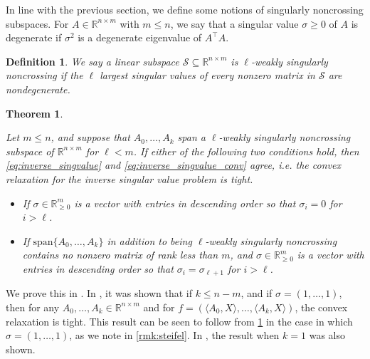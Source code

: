 \documentclass{article}
\numberwithin{equation}{section}
\newcommand{\R}{\mathbb{R}}
\newtheorem{theorem}{Theorem}[section]
\newtheorem{definition}{Definition}[section]
\newcommand{\subspace}{\mathcal{S}}
\newcommand{\demph}[1]{\emph{{\color{RoyalBlue}#1}}}
\begin{document}
In line with the previous section, we %
define some notions of singularly noncrossing subspaces.
For $A \in \R^{n \times m}$ with $m \le n$,
we say that a singular value $\sigma \ge 0$ of $A$ is degenerate if $\sigma^2$ is a degenerate eigenvalue of $A^{\intercal}A$.

\begin{definition}\label{def:singular-noncrossing-subspace}
We say a linear subspace $\subspace \subseteq \R^{n\times m}$ is \demph{$\ell$-weakly singularly noncrossing} if the $\ell$ largest singular values of every nonzero matrix in $\subspace$ are nondegenerate.
\end{definition}

\begin{theorem}
    \label{thm:singvalues}

    Let $m \le n$, and suppose that $A_0, \dots, A_k$ span a $\ell$-weakly singularly noncrossing subspace of $\R^{n \times m}$ for $\ell < m$.
    If either of the following two conditions hold, then \eqref{eq:inverse_singvalue} and \eqref{eq:inverse_singvalue_conv} agree, i.e. the convex relaxation for the inverse singular value problem is tight.

    \begin{itemize}
    \item If $\sigma \in \R_{\ge 0}^m$ is a vector with entries in descending order so that $\sigma_i = 0$ for $i > \ell$.

    \item If $\text{span} \{A_0, \dots, A_k\}$ in addition to being $\ell$-weakly singularly noncrossing contains no nonzero matrix of rank less than $m$, and $\sigma \in \R_{\ge 0}^m$ is a vector with entries in descending order so that $\sigma_i = \sigma_{\ell+1}$ for $i > \ell$.
    \end{itemize}
\end{theorem}
We prove this in .
In \cite{song2024linear}, it was shown that if $k \le n - m$, and if $\sigma = (1,\dots,1)$, then for any $A_0,\ldots, A_{k} \in \R^{n\times m}$ and for $f = (\langle A_0, X\rangle, \dots, \langle A_k, X\rangle)$, the convex relaxation is tight. This result can be seen to follow from \cref{thm:singvalues} in the case in which $\sigma = (1,\dots, 1)$, as we note in \cref{rmk:steifel}. In \cite[Theorem 11.5]{li2000numerical}, the result when $k=1$ was also shown.
\end{document}
